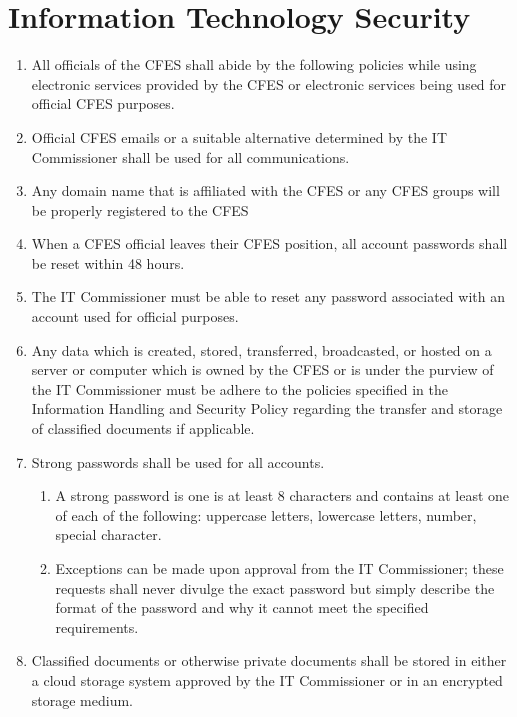 \section{Information Technology Security}
\label{information-technology-security}

\begin{enumerate}
 \item
  All officials of the CFES shall abide by the following policies while using electronic services provided by the CFES or electronic services being used for official CFES purposes.
 \item
  Official CFES emails or a suitable alternative determined by the IT Commissioner shall be used for all communications.
 \item
  Any domain name that is affiliated with the CFES or any CFES groups will be properly registered to the CFES
 \item
  When a CFES official leaves their CFES position, all account passwords shall be reset within 48 hours.
 \item
  The IT Commissioner must be able to reset any password associated with an account used for official purposes.
 \item
  Any data which is created, stored, transferred, broadcasted, or hosted on a server or computer which is owned by the CFES or is under the purview of the IT Commissioner must be adhere to the policies specified in the Information Handling and Security Policy regarding the transfer and storage of classified documents if applicable.
 \item
  Strong passwords shall be used for all accounts.

  \begin{enumerate}
   \item
    A strong password is one is at least 8 characters and contains at least one of each of the following: uppercase letters, lowercase letters, number, special character.
   \item
    Exceptions can be made upon approval from the IT Commissioner; these requests shall never divulge the exact password but simply describe the format of the password and why it cannot meet the specified requirements.
  \end{enumerate}

 \item
  Classified documents or otherwise private documents shall be stored in either a cloud storage system approved by the IT Commissioner or in an encrypted storage medium.


\end{enumerate}
